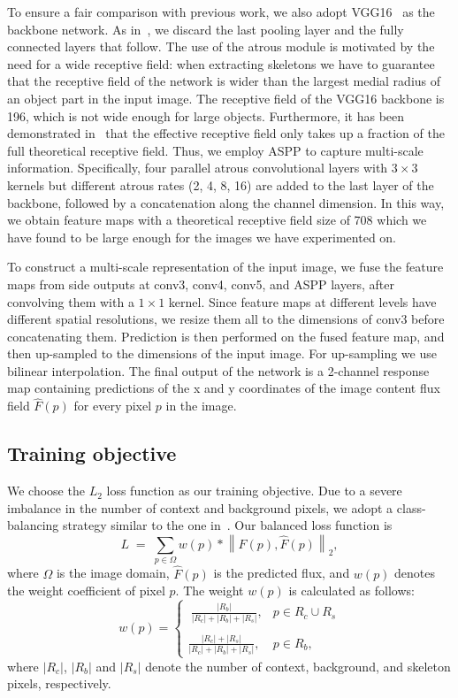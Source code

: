 \documentclass[10pt,twocolumn,letterpaper]{article}
\begin{document}
To ensure a fair comparison with previous work, we also adopt VGG16~\cite{vgg16network} as the backbone network.
As in~\cite{xie2015hed}, we discard the last pooling layer and the fully connected layers that follow.
The use of the atrous module is motivated by the need for a wide receptive field: when extracting skeletons we have to guarantee that the receptive field of the network is wider than the largest medial radius of an object part in the input image.
The receptive field of the VGG16 backbone is 196, which is not wide enough for large objects.
Furthermore, it has been demonstrated in~\cite{luo2016receptivefield} that the effective receptive field only takes up a fraction of the full theoretical receptive field.
Thus, we employ ASPP to capture multi-scale information.
Specifically, four parallel atrous convolutional layers with $3\times3$ kernels but different atrous rates (2, 4, 8, 16) are added to the last layer of the backbone, followed by a concatenation along the channel dimension.
In this way, we obtain feature maps with a theoretical receptive field size of 708 which we have found to be large enough for the images we have experimented on.

To construct a multi-scale representation of the input image, we fuse the feature maps from side outputs at conv3, conv4, conv5, and ASPP layers, after convolving them with a  $1 \times 1$ kernel.
Since feature maps at different levels have different spatial resolutions, we resize them all to the dimensions of conv3 before concatenating them.
Prediction is then performed on the fused feature map, and then up-sampled to the dimensions of the input image.
For up-sampling we use bilinear interpolation.
The final output of the network is a 2-channel response map containing predictions of the x and y coordinates of the image content flux field $\hat{F}(p)$ for every pixel $p$ in the image.

\subsection{Training objective} \label{sec:trainingobjective}
We choose the $L_2$ loss function as our training objective.
Due to a severe imbalance in the number of context and background pixels, we adopt a class-balancing strategy similar to the one in~\cite{xie2015hed}.
Our balanced loss function is
\begin{equation}
L \; = \; \sum_{p \in \Omega}{w(p) * \left\|F(p), \hat{F}(p)\right\|_2},
\label{eq:loss}
\end{equation}
where $\Omega$ is the image domain, $\hat{F}(p)$ is the predicted flux, and $w(p)$ denotes the weight coefficient of pixel $p$.
The weight $w(p)$ is calculated as follows:
\begin{equation}
w(p) =
\left\{
\begin{matrix} \
\frac{|R_b|}{|R_c|+|R_b|+|R_s|}, & p \in R_c \cup R_s \\ \\
\frac{|R_c|+|R_s|}{|R_c|+|R_b|+|R_s|}, & p \in R_b,
\end{matrix}
\right.
\label{eq:weight}
\end{equation}
where $|R_c|$, $|R_b|$ and $|R_s|$ denote the number of context, background, and skeleton pixels, respectively.
\end{document}
